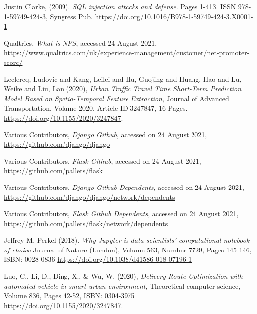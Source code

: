 \documentclass[]{UCD_CS_47360_Report}
\begin{document}
\begin{thebibliography}{99}
Justin Clarke, (2009). \emph{SQL injection attacks and defense}. Pages 1-413. ISSN 978-1-59749-424-3, Syngress Pub. \href{https://doi.org/10.1016/B978-1-59749-424-3.X0001-1}{https://doi.org/10.1016/B978-1-59749-424-3.X0001-1}


 Qualtrics, \emph{What is NPS}, accessed 24 August 2021, \href{https://www.qualtrics.com/uk/experience-management/customer/net-promoter-score/}{https://www.qualtrics.com/uk/experience-management/customer/net-promoter-score/}


Leclercq, Ludovic and Kang, Leilei and Hu, Guojing and Huang, Hao and Lu, Weike and Liu, Lan (2020), \emph{Urban Traffic Travel Time Short-Term Prediction Model Based on Spatio-Temporal Feature Extraction}, Journal of Advanced Transportation, Volume 2020, Article ID 3247847, 16 Pages. \href{https://doi.org/10.1155/2020/3247847}{https://doi.org/10.1155/2020/3247847}.


 Various Contributors, \emph{Django Github}, accessed on 24 August 2021, \href{https://github.com/django/django}{https://github.com/django/django} 


 Various Contributors, \emph{Flask Github}, accessed on 24 August 2021, \href{https://github.com/pallets/flask}{https://github.com/pallets/flask} 



 Various Contributors, \emph{Django Github Dependents}, accessed on 24 August 2021, \href{https://github.com/django/django/network/dependents}{https://github.com/django/django/network/dependents} 


 Various Contributors, \emph{Flask Github Dependents}, accessed on 24 August 2021, \href{https://github.com/pallets/flask/network/dependents}{https://github.com/pallets/flask/network/dependents} 


Jeffrey M. Perkel (2018). \emph{Why Jupyter is data scientists' computational notebook of choice} Journal of Nature (London), Volume 563, Number 7729, Pages 145-146, ISBN: 0028-0836 \href{https://doi.org/10.1038/d41586-018-07196-1}{https://doi.org/10.1038/d41586-018-07196-1}


Luo, C., Li, D., Ding, X., & Wu, W. (2020), \emph{Delivery Route Optimization with automated vehicle in smart urban environment}, Theoretical computer science, Volume 836, Pages 42-52, ISBN: 0304-3975 \href{https://doi.org/10.1155/2020/3247847}{https://doi.org/10.1155/2020/3247847}.


\end{thebibliography}
\label{endpage}
\end{document}
